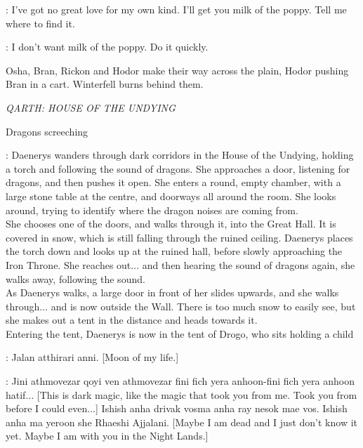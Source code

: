 \OSHA: I've got no great love for my own kind. I'll get you milk of the poppy. Tell me where to find it. 

\LUWIN: I don't want milk of the poppy.  Do it quickly. 


\n Osha, Bran, Rickon and Hodor make their way across the plain, Hodor pushing Bran in a cart. Winterfell burns behind them.


\scene

\textit{QARTH: HOUSE OF THE UNDYING} 

\sfx Dragons screeching


\NARRATOR: Daenerys wanders through dark corridors in the House of the Undying, holding a torch and following the sound of dragons. She approaches a door, listening for dragons, and then pushes it open. She enters a round, empty chamber, with a large stone table at the centre, and doorways all around the room. She looks around, trying to identify where the dragon noises are coming from.\\
She chooses one of the doors, and walks through it, into the Great Hall. It is covered in snow, which is still falling through the ruined ceiling. Daenerys places the torch down and looks up at the ruined hall, before slowly approaching the Iron Throne. She reaches out$\ldots$ and then hearing the sound of dragons again, she walks away, following the sound.\\
As Daenerys walks, a large door in front of her slides upwards, and she walks through$\ldots$ and is now outside the Wall. There is too much snow to easily see, but she makes out a tent in the distance and heads towards it.\\
Entering the tent, Daenerys is now in the tent of Drogo, who sits holding a child

\DROGO: Jalan atthirari anni. [Moon of my life.] 


\DAENERYS: Jini athmovezar qoyi ven athmovezar fini fich yera anhoon-fini fich yera anhoon hatif$\ldots$ [This is dark magic, like the magic that took you from me. Took you from before I could even$\ldots$] Ishish anha drivak vosma anha ray nesok mae vos. Ishish anha ma yeroon she Rhaeshi Ajjalani. [Maybe I am dead and I just don't know it yet. Maybe I am with you in the Night Lands.] 

